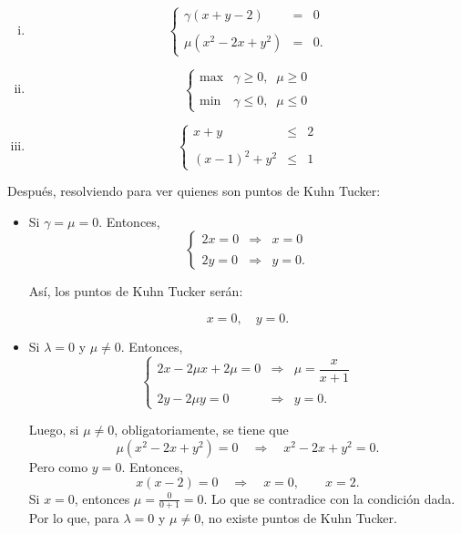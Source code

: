 \begin{enumerate}
\begin{enumerate}[i)]
	    \item $$
		    \left\{
			\begin{array}{rcl}
			    \gamma(x+y-2)& = &0\\\\
			    \mu(x^2-2x+y^2)& = &0.
			\end{array}
		    \right.
		  $$ 

	    \item
		$$
		    \left\{
			\begin{array}{ll}
			     \max & \gamma\geq 0,\; \; \mu\geq 0\\\\
			     \min & \gamma\leq 0,\; \; \mu\leq 0
			\end{array}
		    \right.
		$$
	    \item $$
		    \left\{
			\begin{array}{rcl}
			    x+y&\leq& 2\\\\
			    (x-1)^2+y^2&\leq &1
			\end{array}
		    \right.
		    $$
	\end{enumerate}
	\vspace{.5cm}

	Después, resolviendo para ver quienes son puntos de Kuhn Tucker:\\

	\begin{itemize}
	    \item Si $\gamma = \mu = 0$. Entonces,
		$$\left\{\begin{array}{rcl}
		    2x=0&\Rightarrow &x=0\\\\
		    2y=0&\Rightarrow &y=0.
		\end{array}\right.$$

		Así, los puntos de Kuhn Tucker serán: 
		\begin{tcolorbox}
		    $$x=0,\quad  y=0.$$
		\end{tcolorbox}

	    \item Si $\lambda=0$ y $\mu\neq 0$. Entonces,
		$$\left\{\begin{array}{rcl}
		    2x -2\mu x + 2\mu=0&\Rightarrow &\mu=\dfrac{x}{x+1}\\\\
		    2y-2\mu y=0&\Rightarrow &y=0.
		\end{array}\right.$$

		Luego, si $\mu\neq 0$, obligatoriamente, se tiene que
		$$\mu(x^2-2x+y^2)=0\quad \Rightarrow \quad x^2-2x+y^2=0.$$
		Pero como $y=0$. Entonces,
		$$x(x-2)=0 \quad \Rightarrow \quad x=0,\qquad  x=2.$$
		Si $x=0$, entonces $\mu=\frac{0}{0+1}=0$. Lo que se contradice con la condición dada. Por lo que, para $\lambda=0$ y $\mu\neq 0$, no existe puntos de Kuhn Tucker.\\\\


\end{itemize}
\end{enumerate}
